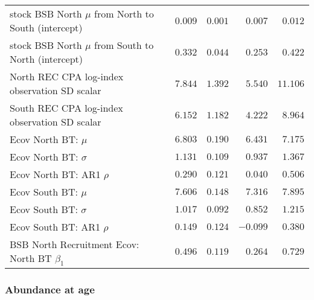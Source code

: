 \documentclass[
]{article}
\begin{document}
\begin{landscape}
\begin{longtable}[t]{lrrrr}
stock BSB North $\mu$ from North to South (intercept) & $0.009$ & $0.001$ & $0.007$ & $0.012$\\
stock BSB North $\mu$ from South to North (intercept) & $0.332$ & $0.044$ & $0.253$ & $0.422$\\
North REC CPA log-index observation SD scalar & $7.844$ & $1.392$ & $5.540$ & $11.106$\\
South REC CPA log-index observation SD scalar & $6.152$ & $1.182$ & $4.222$ & $8.964$\\
\addlinespace
Ecov North BT: $\mu$ & $6.803$ & $0.190$ & $6.431$ & $7.175$\\
Ecov North BT: $\sigma$ & $1.131$ & $0.109$ & $0.937$ & $1.367$\\
Ecov North BT: AR1 $\rho$ & $0.290$ & $0.121$ & $0.040$ & $0.506$\\
Ecov South BT: $\mu$ & $7.606$ & $0.148$ & $7.316$ & $7.895$\\
Ecov South BT: $\sigma$ & $1.017$ & $0.092$ & $0.852$ & $1.215$\\
\addlinespace
Ecov South BT: AR1 $\rho$ & $0.149$ & $0.124$ & $-0.099$ & $0.380$\\
BSB North Recruitment Ecov: North BT $\beta_1$ & $0.496$ & $0.119$ & $0.264$ & $0.729$\\*
\end{longtable}
\end{landscape}

\hypertarget{abundance-at-age}{%
\subsubsection{Abundance at age}\label{abundance-at-age}}
\end{document}
